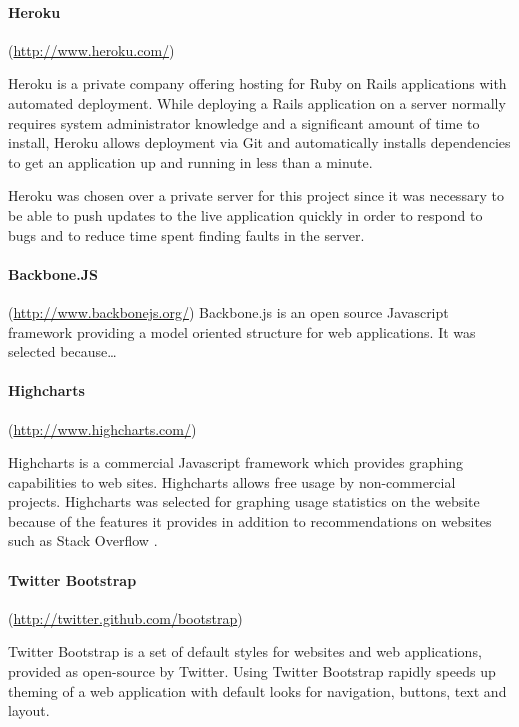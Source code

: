 
\paragraph{Heroku}
(\url{http://www.heroku.com/})

Heroku is a private company offering hosting for Ruby on Rails applications with automated deployment. While deploying
a Rails application on a server normally requires system administrator knowledge and a significant amount of
time to install, Heroku
allows deployment via Git and automatically installs dependencies to get an application up and running in less
than a minute.

Heroku was chosen over a private server for this project since it was necessary to be able to push updates
to the live application quickly in order to respond to bugs and to reduce time spent finding faults in the server.


\paragraph{Backbone.JS}
(\url{http://www.backbonejs.org/})
Backbone.js is an open source Javascript framework providing a model oriented structure for web applications.
It was selected because\ldots


\paragraph{Highcharts}
(\url{http://www.highcharts.com/})

Highcharts is a commercial Javascript framework which provides graphing capabilities to web sites. Highcharts
allows free usage by non-commercial projects. Highcharts was selected for graphing usage statistics
on the website because of the features it provides in addition to recommendations on websites such as Stack Overflow \cite{stackoverflow_highcharts_2012}.

\paragraph{Twitter Bootstrap}
(\url{http://twitter.github.com/bootstrap})

Twitter Bootstrap is a set of default styles for websites and web applications, provided as open-source by Twitter. Using Twitter Bootstrap rapidly speeds up theming of a web application with default looks for navigation, buttons, text and layout.



